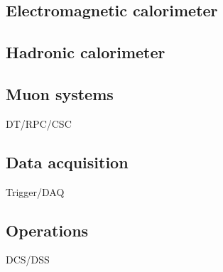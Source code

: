 \cite{Chatrchyan:2014fea}

\subsection{Electromagnetic calorimeter}

\subsection{Hadronic calorimeter}

\subsection{Muon systems}
DT/RPC/CSC

\subsection{Data acquisition}
Trigger/DAQ

\subsection{Operations}
DCS/DSS
